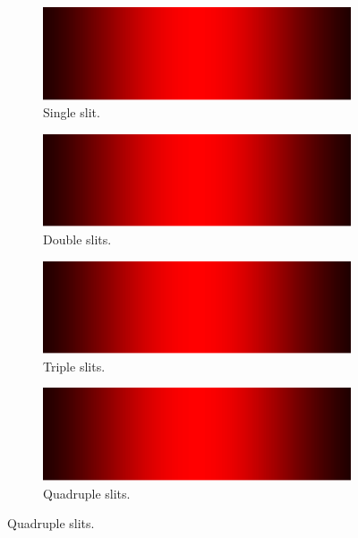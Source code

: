 \documentclass[oneside]{book}
\begin{document}
\begin{figure}[htbp]
    \centering
    \begin{subfigure}[c]{\textwidth}
        \centering
        \includegraphics[width=\textwidth,page=1]{../images/pgf-interference/interference.pdf}
        \caption{Single slit.}
    \end{subfigure}%

    \begin{subfigure}[c]{\textwidth}
        \centering
        \includegraphics[width=\textwidth,page=2]{../images/pgf-interference/interference.pdf}
        \caption{Double slits.}
    \end{subfigure}%

    \begin{subfigure}[c]{\textwidth}
        \centering
        \includegraphics[width=\textwidth,page=3]{../images/pgf-interference/interference.pdf}
        \caption{Triple slits.}
    \end{subfigure}%

    \begin{subfigure}[c]{\textwidth}
        \centering
        \includegraphics[width=\textwidth,page=4]{../images/pgf-interference/interference.pdf}
        \caption{Quadruple slits.}
    \end{subfigure}%
\end{figure}
\end{document}
